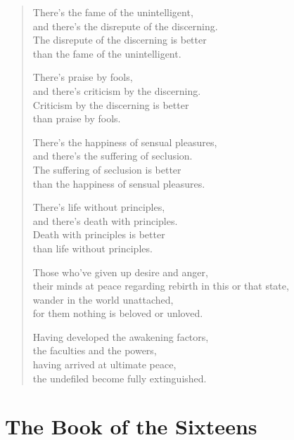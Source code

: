 \documentclass[12pt,openany]{book}%
\let\oldcontentsline\contentsline
\newcommand{\nopagecontentsline}[3]{\oldcontentsline{#1}{#2}{}}
\begin{document}
\begin{verse}
There’s the fame of the unintelligent, \\
and there’s the disrepute of the discerning. \\
The disrepute of the discerning is better \\
than the fame of the unintelligent. 

There’s praise by fools, \\
and there’s criticism by the discerning. \\
Criticism by the discerning is better \\
than praise by fools. 

There’s the happiness of sensual pleasures, \\
and there’s the suffering of seclusion. \\
The suffering of seclusion is better \\
than the happiness of sensual pleasures. 

There’s life without principles, \\
and there’s death with principles. \\
Death with principles is better \\
than life without principles. 

Those who’ve given up desire and anger, \\
their minds at peace regarding rebirth in this or that state, \\
wander in the world unattached, \\
for them nothing is beloved or unloved. 

Having developed the awakening factors, \\
the faculties and the powers, \\
having arrived at ultimate peace, \\
the undefiled become fully extinguished. 

%
\end{verse}

%
\part*{The Book of the Sixteens }
\markboth{}{}
\addtocontents{toc}{\let\protect\contentsline\protect\oldcontentsline}

%
\end{document}
